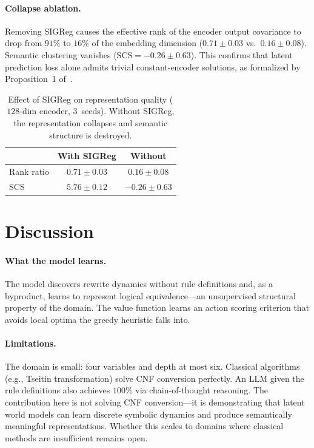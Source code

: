 \documentclass{article}
\begin{document}
\paragraph{Collapse ablation.}
Removing SIGReg causes the effective rank of the encoder output covariance
to drop from $91\%$ to $16\%$ of the embedding dimension
($0.71 \pm 0.03$ vs.\ $0.16 \pm 0.08$). Semantic clustering vanishes
($\text{SCS} = -0.26 \pm 0.63$). This confirms that latent prediction loss
alone admits trivial constant-encoder solutions, as formalized by
Proposition~1 of~\citet{xing2025critiques}.

\begin{table}[t]
  \caption{Effect of SIGReg on representation quality ($128$-dim encoder,
  $3$~seeds). Without SIGReg, the representation collapses and semantic
  structure is destroyed.}
  \label{tab:sigreg}
  \vskip 0.1in
  \begin{center}
    \begin{small}
      \begin{sc}
        \begin{tabular}{lcc}
          \toprule
          & With SIGReg & Without \\
          \midrule
          Rank ratio & $0.71 \pm 0.03$ & $0.16 \pm 0.08$ \\
          SCS & $5.76 \pm 0.12$ & $-0.26 \pm 0.63$ \\
          \bottomrule
        \end{tabular}
      \end{sc}
    \end{small}
  \end{center}
  \vskip -0.1in
\end{table}

\section{Discussion}

\paragraph{What the model learns.}
The model discovers rewrite dynamics without rule definitions and, as a
byproduct, learns to represent logical equivalence---an unsupervised
structural property of the domain. The value function learns an action
scoring criterion that avoids local optima the greedy heuristic falls into.

\paragraph{Limitations.}
The domain is small: four variables and depth at most six. Classical
algorithms (e.g., Tseitin transformation) solve CNF conversion perfectly.
An LLM given the rule definitions also achieves $100\%$ via chain-of-thought
reasoning. The contribution here is not solving CNF conversion---it is
demonstrating that latent world models can learn discrete symbolic dynamics
and produce semantically meaningful representations. Whether this scales to
domains where classical methods are insufficient remains open.
\end{document}
